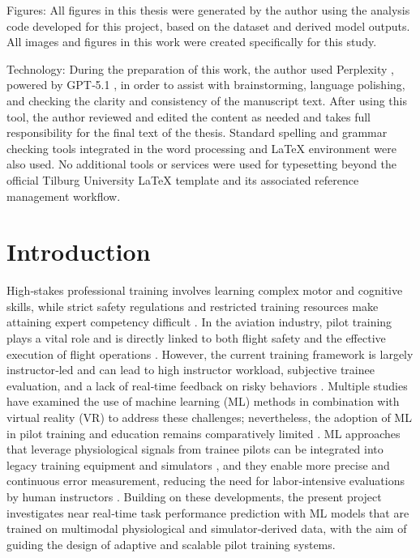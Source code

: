 \documentclass[11pt, a4paper]{article}
\begin{document}
Figures:
All figures in this thesis were generated by the author using the analysis code developed for this project, based on the dataset and derived model outputs. All images and figures in this work were created specifically for this study.

Technology:
During the preparation of this work, the author used Perplexity \cite{perplexity-ai-2026}, powered by GPT‑5.1 \cite{openai-2025}, in order to assist with brainstorming, language polishing, and checking the clarity and consistency of the manuscript text. After using this tool, the author reviewed and edited the content as needed and takes full responsibility for the final text of the thesis. Standard spelling and grammar checking tools integrated in the word processing and LaTeX environment were also used. No additional tools or services were used for typesetting beyond the official Tilburg University LaTeX template and its associated reference management workflow.

\section{Introduction} \label{sec:introduction}
High‑stakes professional training involves learning complex motor and cognitive skills, while strict safety regulations and restricted training resources make attaining expert competency difficult \cite{nassar-2021}. In the aviation industry, pilot training plays a vital role and is directly linked to both flight safety and the effective execution of flight operations \cite{yang-2021}. However, the current training framework is largely instructor‑led and can lead to high instructor workload, subjective trainee evaluation, and a lack of real‑time feedback on risky behaviors \cite{yang-2021}. Multiple studies have examined the use of machine learning (ML) methods in combination with virtual reality (VR) to address these challenges; nevertheless, the adoption of ML in pilot training and education remains comparatively limited \cite{caballero-2023}. ML approaches that leverage physiological signals from trainee pilots can be integrated into legacy training equipment and simulators \cite{caballero-2023}, and they enable more precise and continuous error measurement, reducing the need for labor‑intensive evaluations by human instructors \cite{barry-2025}. Building on these developments, the present project investigates near real‑time task performance prediction with ML models that are trained on multimodal physiological and simulator‑derived data, with the aim of guiding the design of adaptive and scalable pilot training systems.
\end{document}
